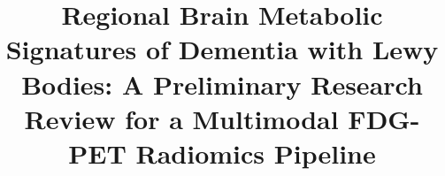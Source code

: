 \documentclass[journal]{IEEEtran}
\begin{document}
\title{Regional Brain Metabolic Signatures of Dementia with Lewy Bodies: A Preliminary Research Review for a Multimodal FDG-PET Radiomics Pipeline}

\author{}

\maketitle









\printbibliography
\end{document}
